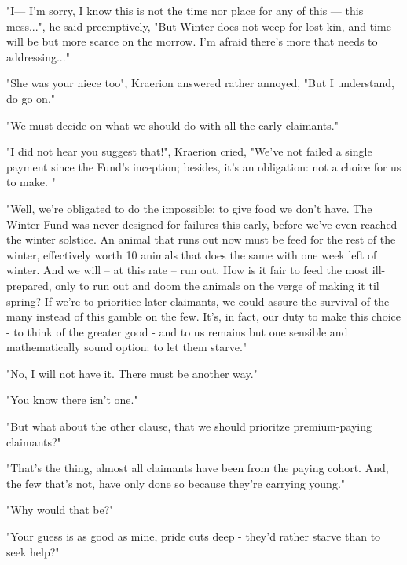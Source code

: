 "I— I'm sorry, I know this is not the time nor place for any of this — this mess...", he said preemptively,  "But Winter does not weep for lost kin, and time will be but more scarce on the morrow. I'm afraid there's more that needs to addressing..."

"She was your niece too", Kraerion answered rather annoyed, "But I understand, do go on."

"We must decide on what we should do with all the early claimants."


"I did not hear you suggest that!", Kraerion cried, "We've not failed a single payment since the Fund's inception; besides, it's an obligation: not a choice for us to make. " 

"Well, we're obligated to do the impossible: to give food we don't have. The Winter Fund was never designed for failures this early, before we've even reached the winter solstice. An animal that runs out now must be feed for the rest of the winter, effectively worth 10 animals that does the same with one week left of winter. And we will – at this rate – run out. How is it fair to feed the most ill-prepared, only to run out and doom the animals on the verge of making it til spring? If we're to prioritice later claimants, we could assure the survival of the many instead of this gamble on the few. It's, in fact, our duty to make this choice - to think of the greater good - and to us remains but one sensible and mathematically sound option: to let them starve."


"No, I will not have it. There must be another way."

"You know there isn't one."

"But what about the other clause, that we should prioritze premium-paying claimants?"

"That's the thing, almost all claimants have been from the paying cohort. And, the few that's not, have only done so because they're carrying young."

"Why would that be?"

"Your guess is as good as mine, pride cuts deep - they'd rather starve than to seek help?"


